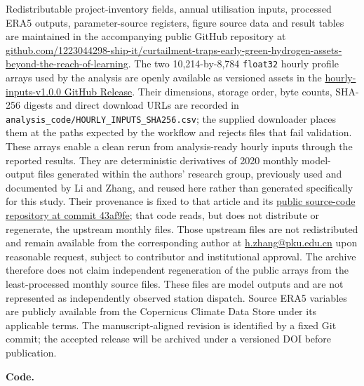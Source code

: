 \documentclass[11pt,a4paper]{article}
\begin{document}
Redistributable project-inventory fields, annual utilisation inputs, processed ERA5 outputs, parameter-source registers, figure source data and result tables are maintained in the accompanying public GitHub repository at \href{https://github.com/1223044298-ship-it/curtailment-traps-early-green-hydrogen-assets-beyond-the-reach-of-learning}{github.com/1223044298-ship-it/curtailment-traps-early-green-hydrogen-assets-beyond-the-reach-of-learning}. The two 10,214-by-8,784 \texttt{float32} hourly profile arrays used by the analysis are openly available as versioned assets in the \href{https://github.com/1223044298-ship-it/curtailment-traps-early-green-hydrogen-assets-beyond-the-reach-of-learning/releases/tag/hourly-inputs-v1.0.0}{hourly-inputs-v1.0.0 GitHub Release}. Their dimensions, storage order, byte counts, SHA-256 digests and direct download URLs are recorded in \texttt{analysis\_code/HOURLY\_INPUTS\_SHA256.csv}; the supplied downloader places them at the paths expected by the workflow and rejects files that fail validation. These arrays enable a clean rerun from analysis-ready hourly inputs through the reported results. They are deterministic derivatives of 2020 monthly model-output files generated within the authors' research group, previously used and documented by Li and Zhang\cite{li2026}, and reused here rather than generated specifically for this study. Their provenance is fixed to that article and its \href{https://github.com/Lynn20001130/-hydrogen-blending-analysis/tree/43af9fef041a7c55ca154cc6a40c5d339c23c521}{public source-code repository at commit 43af9fe}; that code reads, but does not distribute or regenerate, the upstream monthly files. Those upstream files are not redistributed and remain available from the corresponding author at \href{mailto:h.zhang@pku.edu.cn}{h.zhang@pku.edu.cn} upon reasonable request, subject to contributor and institutional approval. The archive therefore does not claim independent regeneration of the public arrays from the least-processed monthly source files. These files are model outputs and are not represented as independently observed station dispatch. Source ERA5 variables are publicly available from the Copernicus Climate Data Store under its applicable terms. The manuscript-aligned revision is identified by a fixed Git commit; the accepted release will be archived under a versioned DOI before publication.

\noindent\textbf{Code.}
\end{document}

